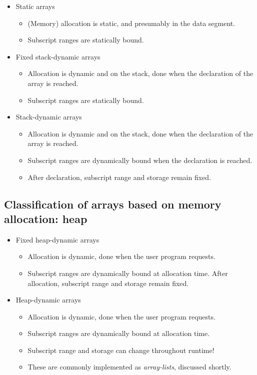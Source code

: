 \documentclass[11pt]{article}
\theoremstyle{definition}
\begin{document}
\begin{itemize}
\item Static arrays
\begin{itemize}
\item (Memory) allocation is static, and presumably in the data segment.
\item Subscript ranges are statically bound.
\end{itemize}
\item Fixed stack-dynamic arrays
\begin{itemize}
\item Allocation is dynamic and on the stack,
done when the declaration of the array is reached.
\item Subscript ranges are statically bound.
\end{itemize}
\item Stack-dynamic arrays
\begin{itemize}
\item Allocation is dynamic and on the stack,
done when the declaration of the array is reached.
\item Subscript ranges are dynamically bound when the declaration is reached.
\item After declaration, subscript range and storage remain fixed.
\end{itemize}
\end{itemize}

\subsection{Classification of arrays based on memory allocation: heap}
\label{sec:org620fc2f}

\begin{itemize}
\item Fixed heap-dynamic arrays
\begin{itemize}
\item Allocation is dynamic, done when the user program requests.
\item Subscript ranges are dynamically bound at allocation time.
After allocation, subscript range and storage remain fixed.
\end{itemize}
\item Heap-dynamic arrays
\begin{itemize}
\item Allocation is dynamic, done when the user program requests.
\item Subscript ranges are dynamically bound at allocation time.
\item Subscript range and storage can change throughout runtime!
\item These are commonly implemented as \emph{array-lists}, discussed shortly.
\end{itemize}
\end{itemize}
\end{document}
